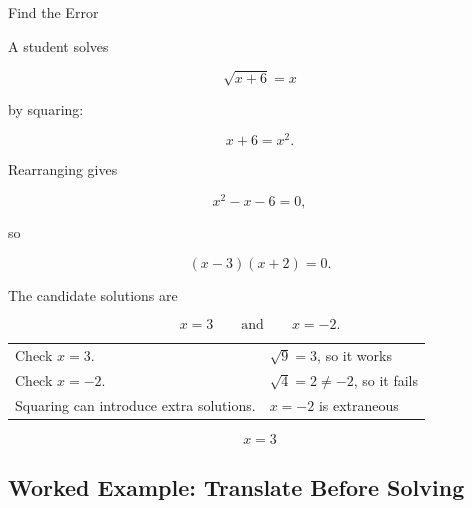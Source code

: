 \begin{workedexamplebox}{Find the Error}

A student solves

\[ \sqrt{x+6}=x \]

by squaring:

\[ x+6=x^2. \]

Rearranging gives

\[ x^2-x-6=0, \]

so

\[ (x-3)(x+2)=0. \]

The candidate solutions are

\[ x=3\qquad\text{and}\qquad x=-2. \]

\begin{tabularx}{\textwidth}{@{}>{\raggedright\arraybackslash}p{}X@{}}
Check \(x=3\). & \(\sqrt{9}=3\), so it works\\
Check \(x=-2\). & \(\sqrt4=2\neq-2\), so it fails\\
Squaring can introduce extra solutions. & \(x=-2\) is extraneous
\end{tabularx}

\begin{answerbox}
\[ x=3 \]
\end{answerbox}
\end{workedexamplebox}

\subsection{Worked Example: Translate Before Solving}
\label{subsec:worked-translate-solving}

